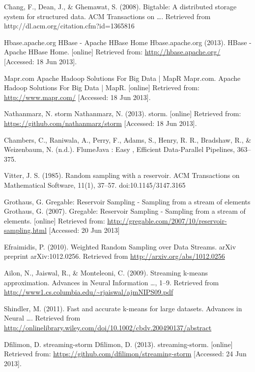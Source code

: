 \documentclass{article}
\begin{document}
\begin{thebibliography}{99}
     Chang, F., Dean, J., \& Ghemawat, S. (2008). Bigtable: A
        distributed storage system for structured data. ACM Transactions on ….
        Retrieved from http://dl.acm.org/citation.cfm?id=1365816

     Hbase.apache.org
        HBase - Apache HBase Home
        Hbase.apache.org (2013). HBase - Apache HBase Home. [online]
        Retrieved from: \url{http://hbase.apache.org/} [Accessed: 18 Jun 2013].

     Mapr.com
        Apache Hadoop Solutions For Big Data | MapR
        Mapr.com. Apache Hadoop Solutions For Big Data | MapR. [online]
        Retrieved from: \url{http://www.mapr.com/} [Accessed: 18 Jun 2013].

     Nathanmarz, N.
        storm
        Nathanmarz, N. (2013). storm. [online] Retrieved from:
        \url{https://github.com/nathanmarz/storm} [Accessed: 18 Jun 2013].

     Chambers, C., Raniwala, A., Perry, F., Adams, S., Henry, R.
        R., Bradshaw, R., \& Weizenbaum, N. (n.d.). FlumeJava : Easy , Efficient
        Data-Parallel Pipelines, 363–375.

     Vitter, J. S. (1985). Random sampling with a reservoir.
        ACM Transactions on Mathematical Software, 11(1), 37–57.
        doi:10.1145/3147.3165

     Grothaus, G.
        Gregable: Reservoir Sampling - Sampling from a stream of elements
        Grothaus, G. (2007). Gregable: Reservoir Sampling - Sampling from a
        stream of elements. [online] Retrieved from:
        \url{http://gregable.com/2007/10/reservoir-sampling.html} [Accessed: 20 Jun
        2013]

     Efraimidis, P. (2010). Weighted Random Sampling over
        Data Streams. arXiv preprint arXiv:1012.0256. Retrieved from
        \url{http://arxiv.org/abs/1012.0256}

     Ailon, N., Jaiswal, R., \& Monteleoni, C. (2009). Streaming
        k-means approximation. Advances in Neural Information …, 1–9. Retrieved
        from \url{http://www1.cs.columbia.edu/~rjaiswal/ajmNIPS09.pdf}

     Shindler, M. (2011). Fast and accurate k-means for large
        datasets. Advances in Neural …. Retrieved from
        \url{http://onlinelibrary.wiley.com/doi/10.1002/cbdv.200490137/abstract}

     Dfilimon, D.  streaming-storm
        Dfilimon, D. (2013). streaming-storm. [online] Retrieved from:
        \url{https://github.com/dfilimon/streaming-storm} [Accessed: 24 Jun 2013].
\end{thebibliography}
\end{document}
